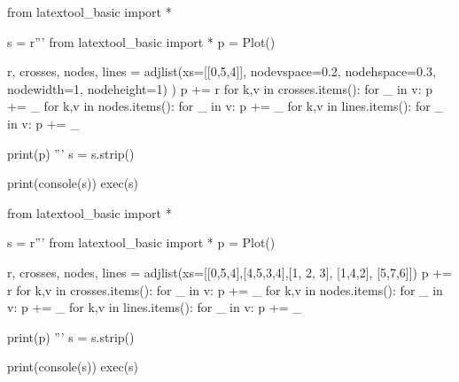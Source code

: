 \begin{python}
from latextool_basic import *

s = r'''
from latextool_basic import *
p = Plot()

r, crosses, nodes, lines = adjlist(xs=[[0,5,4]],
                                   nodevspace=0.2, nodehspace=0.3,
                                   nodewidth=1, nodeheight=1)
)
p += r
for k,v in crosses.items():
    for _ in v: p += _
for k,v in nodes.items():
    for _ in v: p += _
for k,v in lines.items():
    for _ in v: p += _

print(p)
'''
s = s.strip()

print(console(s))
exec(s)
\end{python}






\begin{python}
from latextool_basic import *

s = r'''
from latextool_basic import *
p = Plot()

r, crosses, nodes, lines = adjlist(xs=[[0,5,4],[4,5,3,4],[1, 2, 3], [1,4,2], [5,7,6]])
p += r
for k,v in crosses.items():
    for _ in v: p += _
for k,v in nodes.items():
    for _ in v: p += _
for k,v in lines.items():
    for _ in v: p += _

print(p)
'''
s = s.strip()

print(console(s))
exec(s)
\end{python}

